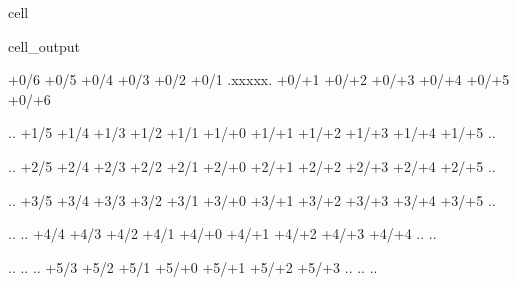 \documentclass[letterpaper,10pt,english]{jupyterBook}
\begin{document}
\begin{sphinxuseclass}{cell}
\begin{sphinxVerbatimOutput}
\begin{sphinxuseclass}{cell_output}
\begin{sphinxVerbatim}[commandchars=\\\{\}]
 \PYGZob{}+0/\PYGZhy{}6\PYGZcb{} \PYGZob{}+0/\PYGZhy{}5\PYGZcb{} \PYGZob{}+0/\PYGZhy{}4\PYGZcb{} \PYGZob{}+0/\PYGZhy{}3\PYGZcb{} \PYGZob{}+0/\PYGZhy{}2\PYGZcb{} \PYGZob{}+0/\PYGZhy{}1\PYGZcb{} .xxxxx. \PYGZob{}+0/+1\PYGZcb{} \PYGZob{}+0/+2\PYGZcb{} \PYGZob{}+0/+3\PYGZcb{} \PYGZob{}+0/+4\PYGZcb{} \PYGZob{}+0/+5\PYGZcb{} \PYGZob{}+0/+6\PYGZcb{} 



 .\PYGZus{}\PYGZus{}\PYGZus{}\PYGZus{}\PYGZus{}. \PYGZob{}+1/\PYGZhy{}5\PYGZcb{} \PYGZob{}+1/\PYGZhy{}4\PYGZcb{} \PYGZob{}+1/\PYGZhy{}3\PYGZcb{} \PYGZob{}+1/\PYGZhy{}2\PYGZcb{} \PYGZob{}+1/\PYGZhy{}1\PYGZcb{} \PYGZob{}+1/+0\PYGZcb{} \PYGZob{}+1/+1\PYGZcb{} \PYGZob{}+1/+2\PYGZcb{} \PYGZob{}+1/+3\PYGZcb{} \PYGZob{}+1/+4\PYGZcb{} \PYGZob{}+1/+5\PYGZcb{} .\PYGZus{}\PYGZus{}\PYGZus{}\PYGZus{}\PYGZus{}. 



 .\PYGZus{}\PYGZus{}\PYGZus{}\PYGZus{}\PYGZus{}. \PYGZob{}+2/\PYGZhy{}5\PYGZcb{} \PYGZob{}+2/\PYGZhy{}4\PYGZcb{} \PYGZob{}+2/\PYGZhy{}3\PYGZcb{} \PYGZob{}+2/\PYGZhy{}2\PYGZcb{} \PYGZob{}+2/\PYGZhy{}1\PYGZcb{} \PYGZob{}+2/+0\PYGZcb{} \PYGZob{}+2/+1\PYGZcb{} \PYGZob{}+2/+2\PYGZcb{} \PYGZob{}+2/+3\PYGZcb{} \PYGZob{}+2/+4\PYGZcb{} \PYGZob{}+2/+5\PYGZcb{} .\PYGZus{}\PYGZus{}\PYGZus{}\PYGZus{}\PYGZus{}. 



 .\PYGZus{}\PYGZus{}\PYGZus{}\PYGZus{}\PYGZus{}. \PYGZob{}+3/\PYGZhy{}5\PYGZcb{} \PYGZob{}+3/\PYGZhy{}4\PYGZcb{} \PYGZob{}+3/\PYGZhy{}3\PYGZcb{} \PYGZob{}+3/\PYGZhy{}2\PYGZcb{} \PYGZob{}+3/\PYGZhy{}1\PYGZcb{} \PYGZob{}+3/+0\PYGZcb{} \PYGZob{}+3/+1\PYGZcb{} \PYGZob{}+3/+2\PYGZcb{} \PYGZob{}+3/+3\PYGZcb{} \PYGZob{}+3/+4\PYGZcb{} \PYGZob{}+3/+5\PYGZcb{} .\PYGZus{}\PYGZus{}\PYGZus{}\PYGZus{}\PYGZus{}. 



 .\PYGZus{}\PYGZus{}\PYGZus{}\PYGZus{}\PYGZus{}. .\PYGZus{}\PYGZus{}\PYGZus{}\PYGZus{}\PYGZus{}. \PYGZob{}+4/\PYGZhy{}4\PYGZcb{} \PYGZob{}+4/\PYGZhy{}3\PYGZcb{} \PYGZob{}+4/\PYGZhy{}2\PYGZcb{} \PYGZob{}+4/\PYGZhy{}1\PYGZcb{} \PYGZob{}+4/+0\PYGZcb{} \PYGZob{}+4/+1\PYGZcb{} \PYGZob{}+4/+2\PYGZcb{} \PYGZob{}+4/+3\PYGZcb{} \PYGZob{}+4/+4\PYGZcb{} .\PYGZus{}\PYGZus{}\PYGZus{}\PYGZus{}\PYGZus{}. .\PYGZus{}\PYGZus{}\PYGZus{}\PYGZus{}\PYGZus{}. 



 .\PYGZus{}\PYGZus{}\PYGZus{}\PYGZus{}\PYGZus{}. .\PYGZus{}\PYGZus{}\PYGZus{}\PYGZus{}\PYGZus{}. .\PYGZus{}\PYGZus{}\PYGZus{}\PYGZus{}\PYGZus{}. \PYGZob{}+5/\PYGZhy{}3\PYGZcb{} \PYGZob{}+5/\PYGZhy{}2\PYGZcb{} \PYGZob{}+5/\PYGZhy{}1\PYGZcb{} \PYGZob{}+5/+0\PYGZcb{} \PYGZob{}+5/+1\PYGZcb{} \PYGZob{}+5/+2\PYGZcb{} \PYGZob{}+5/+3\PYGZcb{} .\PYGZus{}\PYGZus{}\PYGZus{}\PYGZus{}\PYGZus{}. .\PYGZus{}\PYGZus{}\PYGZus{}\PYGZus{}\PYGZus{}. .\PYGZus{}\PYGZus{}\PYGZus{}\PYGZus{}\PYGZus{}. 




\end{sphinxVerbatim}
\end{sphinxuseclass}
\end{sphinxVerbatimOutput}
\end{sphinxuseclass}
\end{document}

